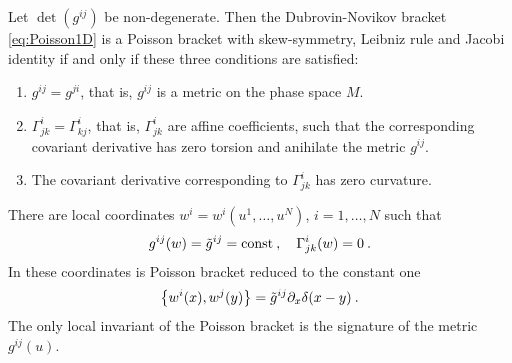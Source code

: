\begin{theorem} \label{Theorem-Dubrovin-Novikov-1D}
    Let $\det(g^{ij})$ be non-degenerate. Then the Dubrovin-Novikov bracket \eqref{eq:Poisson1D} is a Poisson bracket with skew-symmetry, Leibniz rule and Jacobi identity if and only if these three conditions are satisfied:
    \begin{enumerate}
        \item $g^{ij} = g^{ji}$, that is, $g^{ij}$ is a metric on the phase space $M$.
        \item $\Gamma^{i}_{jk} = \Gamma^i_{kj}$, that is, $\Gamma^{i}_{jk}$ are affine coefficients, such that the corresponding covariant derivative has zero torsion and anihilate the metric $g^{ij}$.
        \item The covariant derivative corresponding to $\Gamma^{i}_{jk}$ has zero curvature.
    \end{enumerate}
\end{theorem}

\begin{corollary} \label{Corollary: existence of flat coordinates}
    There are local coordinates $w^i = w^i(u^1, \dots, u^N)$, $i = 1, \dots, N$ such that
    \begin{align}
        g^{ij}(w) = \tilde g^{ij} = \mathrm{const} \:, \quad \Gamma^i_{jk} (w) = 0 \:.
    \end{align}
    In these coordinates is Poisson bracket reduced to the constant one
    \begin{align}
        \left \lbrace w^i(x),w^j(y) \right \rbrace = \tilde{g}^{ij} \partial_x \delta(x-y) \:.
    \end{align}
    The only local invariant of the Poisson bracket is the signature of the metric $g^{ij}(u)$.
\end{corollary}

